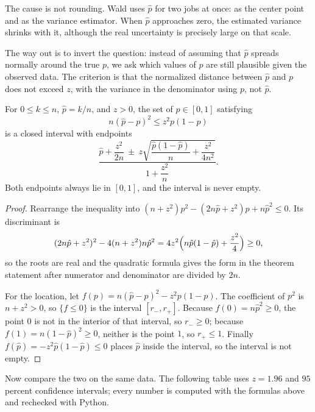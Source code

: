 The cause is not rounding. Wald uses $\hat p$ for two jobs at once: as the center point and as
the variance estimator. When $\hat p$ approaches zero, the estimated variance shrinks with it,
although the real uncertainty is precisely large on that scale.

The way out is to invert the question: instead of assuming that $\hat p$ spreads normally
around the true $p$, we ask which values of $p$ are still plausible given the observed data.
The criterion is that the normalized distance between $\hat p$ and $p$ does not exceed $z$,
with the variance in the denominator using $p$, not $\hat p$.


\begin{teorema}
For $0\le k\le n$, $\hat p=k/n$, and $z>0$, the set of $p\in[0,1]$ satisfying
\[
n(\hat p-p)^2\le z^2p(1-p)
\]
is a closed interval with endpoints
\[
\frac{\hat p+\dfrac{z^2}{2n}\ \pm\
z\sqrt{\dfrac{\hat p(1-\hat p)}{n}+\dfrac{z^2}{4n^2}}}{1+\dfrac{z^2}{n}} .
\]
Both endpoints always lie in $[0,1]$, and the interval is never empty.
\end{teorema}

\begin{proof}[Proof]
Rearrange the inequality into $(n+z^2)p^2-(2n\hat p+z^2)p+n\hat p^2\le0$.
Its discriminant is
\[
(2n\hat p+z^2)^2-4(n+z^2)n\hat p^2
=4z^2\Bigl(n\hat p(1-\hat p)+\frac{z^2}{4}\Bigr)\ge0,
\]
so the roots are real and the quadratic formula gives the form in the theorem statement after
numerator and denominator are divided by $2n$.

For the location, let $f(p)=n(\hat p-p)^2-z^2p(1-p)$. The coefficient of $p^2$ is
$n+z^2>0$, so $\{f\le0\}$ is the interval $[r_-,r_+]$. Because
$f(0)=n\hat p^2\ge0$, the point $0$ is not in the interior of that interval, so
$r_-\ge0$; because $f(1)=n(1-\hat p)^2\ge0$, neither is the point $1$, so
$r_+\le1$. Finally $f(\hat p)=-z^2\hat p(1-\hat p)\le0$ places $\hat p$ inside the
interval, so the interval is not empty.
\end{proof}

Now compare the two on the same data. The following table uses $z=1.96$ and
$95$ percent confidence intervals; every number is computed with the formulas above and
rechecked with Python.

